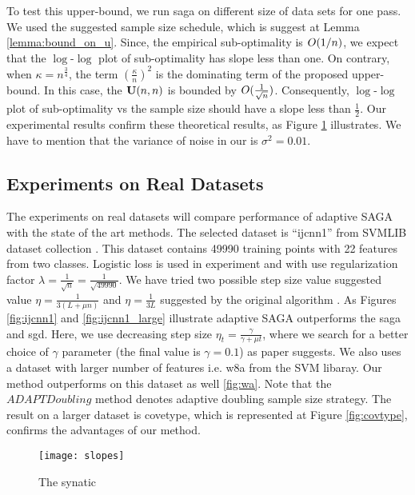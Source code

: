 To test this upper-bound, we run saga on different size of data sets for one
pass. We used the suggested sample size schedule, which is suggest at Lemma
\ref{lemma:bound_on_u}. Since, the empirical sub-optimality is $O(1/n)$, we
expect that the $\log$-$\log$ plot of sub-optimality has slope less than one. On
contrary, when $\kappa = n^{\frac{3}{4}}$, the term $(\frac{\kappa}{n})^2$ is the
dominating term of the proposed upper-bound. In this case, the $\mathbf U(n,n)$ is
bounded by $O(\frac{1}{\sqrt{n}})$. Consequently, $\log$-$\log$ plot of
sub-optimality vs the sample size should have a slope less than $\frac{1}{2}$.
Our experimental results confirm these theoretical results, as Figure \ref{fig:slopes}
illustrates. We have to mention that the variance of noise in our is $\sigma^2
= 0.01$.
\subsection{Experiments on Real Datasets}
The experiments on real datasets will compare performance of adaptive SAGA with
the state of the art methods.
 The selected dataset is ``ijcnn1'' from SVMLIB
 dataset collection \cite{REF08a}. This dataset contains 49990 training points
 with 22 features from two classes. Logistic loss is used in experiment and with
 use regularization factor $\lambda = \frac{1}{\sqrt{n}} =
 \frac{1}{\sqrt{49990}}$. We have tried two possible step size value suggested
 value $\eta = \frac{1}{3(L+\mu n )}$ and $\eta = \frac{1}{3L}$ suggested by
 the original algorithm \cite{defazio2014saga}. As Figures \ref{fig:ijcnn1} and 
 \ref{fig:ijcnn1_large} illustrate adaptive SAGA outperforms the saga and sgd. 
 Here, we use decreasing step size $\eta_t = \frac{\gamma}{\gamma+\mu t}$, where
 we search for a better choice of $\gamma$ parameter (the final value is $\gamma
 = 0.1$) as paper \cite{bottou2010large} suggests. 
 We also uses a dataset with larger number of features i.e. w8a from the SVM
 libaray. Our method outperforms on this dataset as well \ref{fig:wa}. Note that
 the $ADAPTDoubling$ method denotes adaptive doubling sample size strategy. The
 result on a larger dataset is covetype, which is represented at Figure
 \ref{fig:covtype}, confirms the advantages of our method. 
 \begin{figure}
\center
\texttt{[image: slopes]} 
\caption{The synatic }
\label{fig:slopes}
\end{figure}

